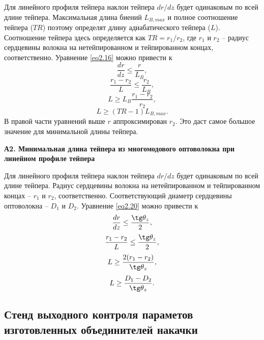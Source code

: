 Для линейного профиля тейпера наклон тейпера $dr/dz$ будет одинаковым по всей длине тейпера. Максимальная длина биений $L_{B,max}$ и полное соотношение тейпера ($TR$) поэтому определят длину адиабатического тейпера ($L$). Соотношение тейпера здесь определяется как $TR=r_1/r_2$, где $r_1$ и $r_2$ -- радиус сердцевины волокна на нетейпированном и тейпированном концах, соответственно. Уравнение \eqref{eq2.16} можно привести к
\begin{equation}\label{eqA1}
  \frac{dr}{dz}\le\frac{r}{L_B},
\end{equation}
\begin{equation}\label{eqA2}
  \frac{r_1-r_2}{L}\le\frac{r_2}{L_B},
\end{equation}
\begin{equation}\label{eqA3}
  L\ge L_B\frac{r_1-r_2}{r_2},
\end{equation}
\begin{equation}\label{eqA4}
  L\ge(TR-1)L_{B,max}.
\end{equation}
В правой части уравнений выше $r$ аппроксимирован $r_2$. Это даст самое большое значение для минимальной длины тейпера.

\noindent
\textbf{А2. Минимальная длина тейпера из многомодового оптоволокна при линейном профиле тейпера}

Для линейного профиля тейпера наклон тейпера $dr/dz$ будет одинаковым по всей длине тейпера. Радиус сердцевины волокна на нетейпированном и тейпированном концах -- $r_1$ и $r_2$, соответственно. Соответствующий диаметр сердцевины оптоволокна -- $D_1$ и $D_2$. Уравнение \eqref{eq2.20} можно привести к
\begin{equation}\label{eqA5}
  \frac{dr}{dz}\le\frac{\tg\theta_z}{2},
\end{equation}
\begin{equation}\label{eqA6}
  \frac{r_1-r_2}{L}\le\frac{\tg\theta_z}{2},
\end{equation}
\begin{equation}\label{eqA7}
  L\ge\frac{2(r_1-r_2)}{\tg\theta_z},
\end{equation}
\begin{equation}\label{eqA8}
  L\ge\frac{D_1-D_2}{\tg\theta_z}.
\end{equation}


\subsection{Стенд выходного контроля параметов изготовленных объединителей накачки}

